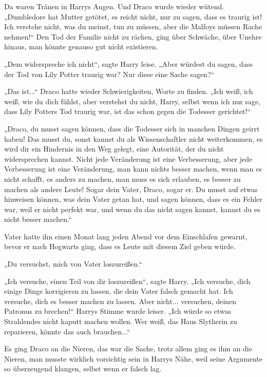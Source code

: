 {Da waren Tränen in Harrys Augen. Und Draco wurde wieder wütend. „Dumbledore hat Mutter getötet, es reicht nicht, nur zu sagen, dass es traurig ist! Ich verstehe nicht, was du meinst, tun zu müssen, aber die Malfoys müssen Rache nehmen!“ Den Tod der Familie nicht zu rächen, ging über Schwäche, über Unehre hinaus, man könnte genauso gut nicht existieren.

„Dem widerspreche ich nicht“, sagte Harry leise. „Aber würdest du sagen, dass der Tod von Lily Potter traurig war? Nur diese eine Sache sagen?“

„Das ist...“ Draco hatte wieder Schwierigkeiten, Worte zu finden. „Ich weiß, ich weiß, wie du dich fühlst, aber verstehst du nicht, Harry, selbst wenn ich nur sage, dass Lily Potters Tod traurig war, ist das schon gegen die Todesser gerichtet!“

„Draco, du musst sagen können, dass die Todesser sich in manchen Dingen geirrt haben! Das musst du, sonst kannst du als Wissenschaftler nicht weiterkommen, es wird dir ein Hindernis in den Weg gelegt, eine Autorität, der du nicht widersprechen kannst. Nicht jede Veränderung ist eine Verbesserung, aber jede Verbesserung ist eine Veränderung, man kann nichts besser machen, wenn man es nicht schafft, es anders zu machen, man muss es sich erlauben, es besser zu machen als andere Leute! Sogar dein Vater, Draco, sogar er. Du musst auf etwas hinweisen können, was dein Vater getan hat, und sagen können, dass es ein Fehler war, weil er nicht perfekt war, und wenn du das nicht sagen kannst, kannst du es nicht besser machen.“

Vater hatte ihn einen Monat lang jeden Abend vor dem Einschlafen gewarnt, bevor er nach Hogwarts ging, dass es Leute mit diesem Ziel geben würde.

„Du versuchst, mich von Vater loszureißen.“

„Ich versuche, einen Teil von dir loszureißen“, sagte Harry. „Ich versuche, dich einige Dinge korrigieren zu lassen, die dein Vater falsch gemacht hat. Ich versuche, dich es besser machen zu lassen. Aber nicht... versuchen, deinen Patronus zu brechen!“ Harrys Stimme wurde leiser. „Ich würde so etwas Strahlendes nicht kaputt machen wollen. Wer weiß, das Haus Slytherin zu reparieren, könnte das auch brauchen...“

Es ging Draco an die Nieren, das war die Sache, trotz allem ging es ihm an die Nieren, man musste wirklich vorsichtig sein in Harrys Nähe, weil seine Argumente so überzeugend klangen, selbst wenn er falsch lag.

}
